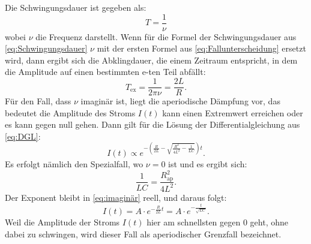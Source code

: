 Die Schwingungsdauer ist gegeben als:
\begin{equation}
\label{eq:Schwingungsdauer}
T = \frac{1}{\nu}
\end{equation}
wobei $\nu$ die Frequenz darstellt.
Wenn für die Formel der Schwingungsdauer aus \ref{eq:Schwingungsdauer} $\nu$ mit der ersten Formel aus \ref{eq:Fallunterscheidung} ersetzt wird, dann ergibt sich die Abklingdauer, die einem Zeitraum entspricht, in dem die Amplitude auf einen bestimmten e-ten Teil abfällt:
\begin{equation*}
T_{\text{ex}} = \frac{1}{2 \pi \nu} = \frac{2L}{R}.
\end{equation*}
Für den Fall, dass $\nu$ imaginär ist, liegt die aperiodische Dämpfung vor, das bedeutet die Amplitude des Stroms $I(t)$ kann einen Extremwert erreichen oder es kann gegen null gehen. Dann gilt für die Lösung der Differentialgleichung aus \ref{eq:DGL}:
\begin{equation}
\label{eq:imaginär}
I(t) \propto e^{-(\frac{R}{2L}-\sqrt{\frac{R^{2}}{4L^{2}}-\frac{1}{LC}})t}.
\end{equation}
Es erfolgt nämlich den Spezialfall, wo $\nu = 0$ ist und es ergibt sich:
\begin{equation*}
\frac{1}{LC} = \frac{R_\text{ap}^{2}}{4L^{2}}.
\end{equation*}
Der Exponent bleibt in \ref{eq:imaginär} reell, und daraus folgt:
\begin{equation*}
I(t) = A \cdot e^{-{\frac{R}{2L}t}} = A \cdot e^{-\frac{t}{\sqrt{LC}}}.
\end{equation*}
Weil die Amplitude der Stroms $I(t)$ hier am schnellsten gegen 0 geht, ohne dabei zu schwingen, wird dieser Fall als aperiodischer Grenzfall bezeichnet.

